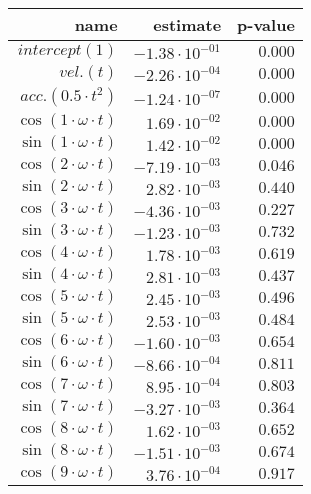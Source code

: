 \begin{tabular}{r|rr}
\hline
 name                           & estimate               & p-value   \\
\hline
 $intercept (1)$                & $-1.38 \cdot 10^{-01}$ & $0.000$   \\
 $vel. (t)$                     & $-2.26 \cdot 10^{-04}$ & $0.000$   \\
 $acc. (0.5 \cdot t^2)$         & $-1.24 \cdot 10^{-07}$ & $0.000$   \\
 $\cos(1 \cdot \omega \cdot t)$ & $1.69 \cdot 10^{-02}$  & $0.000$   \\
 $\sin(1 \cdot \omega \cdot t)$ & $1.42 \cdot 10^{-02}$  & $0.000$   \\
 $\cos(2 \cdot \omega \cdot t)$ & $-7.19 \cdot 10^{-03}$ & $0.046$   \\
 $\sin(2 \cdot \omega \cdot t)$ & $2.82 \cdot 10^{-03}$  & $0.440$   \\
 $\cos(3 \cdot \omega \cdot t)$ & $-4.36 \cdot 10^{-03}$ & $0.227$   \\
 $\sin(3 \cdot \omega \cdot t)$ & $-1.23 \cdot 10^{-03}$ & $0.732$   \\
 $\cos(4 \cdot \omega \cdot t)$ & $1.78 \cdot 10^{-03}$  & $0.619$   \\
 $\sin(4 \cdot \omega \cdot t)$ & $2.81 \cdot 10^{-03}$  & $0.437$   \\
 $\cos(5 \cdot \omega \cdot t)$ & $2.45 \cdot 10^{-03}$  & $0.496$   \\
 $\sin(5 \cdot \omega \cdot t)$ & $2.53 \cdot 10^{-03}$  & $0.484$   \\
 $\cos(6 \cdot \omega \cdot t)$ & $-1.60 \cdot 10^{-03}$ & $0.654$   \\
 $\sin(6 \cdot \omega \cdot t)$ & $-8.66 \cdot 10^{-04}$ & $0.811$   \\
 $\cos(7 \cdot \omega \cdot t)$ & $8.95 \cdot 10^{-04}$  & $0.803$   \\
 $\sin(7 \cdot \omega \cdot t)$ & $-3.27 \cdot 10^{-03}$ & $0.364$   \\
 $\cos(8 \cdot \omega \cdot t)$ & $1.62 \cdot 10^{-03}$  & $0.652$   \\
 $\sin(8 \cdot \omega \cdot t)$ & $-1.51 \cdot 10^{-03}$ & $0.674$   \\
 $\cos(9 \cdot \omega \cdot t)$ & $3.76 \cdot 10^{-04}$  & $0.917$   \\
\hline
\end{tabular}\hspace{1cm}\begin{tabular}{r|rr}

\end{tabular}
